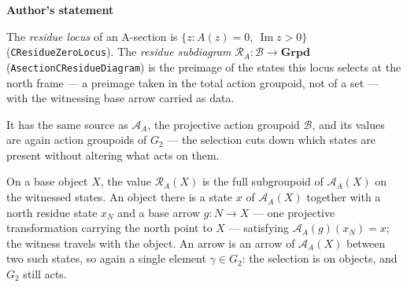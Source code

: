 \documentclass[11pt]{article}
\theoremstyle{plain}
\theoremstyle{definition}
\theoremstyle{remark}
\begin{document}
\begin{tcolorbox}[provenancecard,title={45. Definition - The residue subdiagram and its inclusion},title after break={45. Definition - The residue subdiagram and its inclusion (continued)}]
\textbf{Author's statement}\par
The \emph{residue locus} of an A-section is $\{z : A(z)=0,\ \operatorname{Im}z>0\}$
\textup{(}\texttt{CResidueZeroLocus}\textup{)}. The \emph{residue subdiagram}
$\mathcal R_A:\mathcal B\to\mathbf{Grpd}$ \textup{(}\texttt{AsectionCResidueDiagram}\textup{)} is
the preimage of the states this locus selects at the north frame --- a preimage taken in the
total action groupoid, not of a set --- with the witnessing base arrow carried as data.

It has the same source as $\mathcal A_A$, the projective action groupoid
$\mathcal B$, and its values are again action groupoids of $G_2$ --- the
selection cuts down which states are present without altering what acts on
them.

On a base object $X$, the value $\mathcal R_A(X)$ is the full subgroupoid of
$\mathcal A_A(X)$ on the witnessed states. An object there is a state $x$ of
$\mathcal A_A(X)$ together with a north residue state $x_N$ and a base arrow
$g:N\to X$ --- one projective transformation carrying the north point to $X$
--- satisfying $\mathcal A_A(g)(x_N)=x$; the witness travels with the object.
An arrow is an arrow of $\mathcal A_A(X)$ between two such states, so again a
single element $\gamma\in G_2$: the selection is on objects, and $G_2$ still
acts.


\end{tcolorbox}
\end{document}
